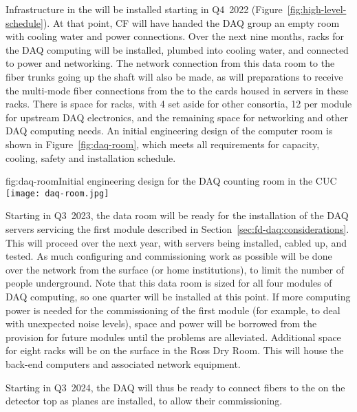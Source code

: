 
Infrastructure in the  will be installed starting in Q4~2022
(Figure~\ref{fig:high-level-schedule}).  At that point, CF will have
handed the DAQ group an empty room with cooling water and power
connections.  Over the next nine months, racks for the DAQ computing
will be installed, plumbed into cooling water, and connected to power
and networking.  The network connection from this data room to the fiber
trunks going up the shaft will also be made, as will preparations to
receive the multi-mode fiber connections from the  to the
 cards housed in servers in these racks. There is space
for \cucracks racks, with 4 set aside for other consortia, 12 per
module for upstream DAQ electronics, and the remaining space for
networking and other DAQ computing needs. An initial engineering design of the computer room is shown in Figure~\ref{fig:daq-room}, which meets all requirements for capacity, cooling, safety and installation schedule.

\begin{dunefigure}{fig:daq-room}{Initial engineering design for the DAQ counting room in the CUC}
  \texttt{[image: daq-room.jpg]}
\end{dunefigure}

Starting in Q3~2023, the data room will be ready for the installation of
the DAQ servers servicing the first module described in
Section~\ref{sec:fd-daq:considerations}.  This will proceed over the
next year, with servers being installed, cabled up, and tested.
As much configuring and commissioning work as possible will be done over
the network from the surface (or home institutions), to limit the number
of people underground.  Note that this data room is sized for all four
modules of DAQ computing, so one quarter will be installed at this
point.  If more computing power is needed for the commissioning of the
first module (for example, to deal with unexpected noise levels), space
and power will be borrowed from the provision for future modules until the problems are
alleviated. 
Additional space for eight racks will be on the surface in the Ross Dry
Room. This will house the back-end computers and associated network equipment.

Starting in Q3~2024, the DAQ will thus be ready to connect fibers to the
 on the detector top as planes are installed, to allow their commissioning.

